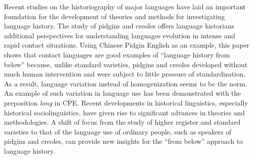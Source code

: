 \documentclass[english,output=paper,colorlinks,citecolor=brown]{../langscibook}
\begin{document}
Recent studies on the historiography of major languages have laid an important foundation for the development of theories and methods for investigating language history. The study of pidgins and creoles offers language historians additional perspectives for understanding languages evolution in intense and rapid contact situations. Using Chinese Pidgin English as an example, this paper shows that contact languages are good examples of “language history from below” because, unlike standard varieties, pidgins and creoles developed without much human intervention and were subject to little pressure of standardization. As a result, language variation instead of homogenization seems to be the norm. An example of such variation in language use has been demonstrated with the preposition \textit{long} in CPE. Recent developments in historical linguistics, especially historical sociolinguistics, have given rise to significant advances in theories and methodologies. A shift of focus from the study of higher register and standard varieties to that of the language use of ordinary people, such as speakers of pidgins and creoles, can provide new insights for the “from below” approach to language history.




{\sloppy\printbibliography[heading=subbibliography,notkeyword=this]}
\end{document}
